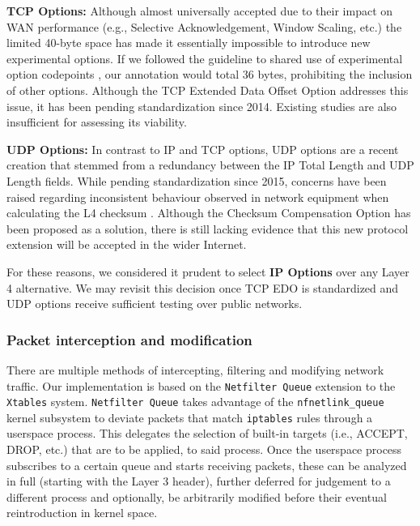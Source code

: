 \textbf{TCP Options:} Although almost universally accepted due to their impact on WAN performance (e.g., Selective Acknowledgement, Window Scaling, etc.) the limited 40-byte space \cite{john1981transmission} has made it essentially impossible to introduce new experimental options. If we followed the guideline to shared use of experimental option codepoints \cite{rfc6994}, our annotation would total 36 bytes, prohibiting the inclusion of other options. Although the TCP Extended Data Offset Option \cite{ietf-tcpm-tcp-edo-13} addresses this issue, it has been pending standardization since 2014. Existing studies \cite{trieu2015implementation} are also insufficient for assessing its viability.

\textbf{UDP Options:} In contrast to IP and TCP options, UDP options are a recent creation \cite{ietf-tsvwg-udp-options-23} that stemmed from a redundancy between the IP Total Length and UDP Length fields. While pending standardization since 2015, concerns have been raised regarding inconsistent behaviour observed in network equipment when calculating the L4 checksum \cite{zullo2020overcoming}. Although the Checksum Compensation Option \cite{fairhurst-udp-options-cco-00} has been proposed as a solution, there is still lacking evidence that this new protocol extension will be accepted in the wider Internet.

For these reasons, we considered it prudent to select \textbf{IP Options} over any Layer 4 alternative. We may revisit this decision once TCP EDO is standardized and UDP options receive sufficient testing over public networks.


\subsubsection{Packet interception and modification}

There are multiple methods of intercepting, filtering and modifying network traffic. Our implementation is based on the \texttt{Netfilter Queue} extension to the \texttt{Xtables} system. \texttt{Netfilter Queue} takes advantage of the \texttt{nfnetlink\_queue} kernel subsystem to deviate packets that match \texttt{iptables} rules through a userspace process. This delegates the selection of built-in targets (i.e., ACCEPT, DROP, etc.) that are to be applied, to said process. Once the userspace process subscribes to a certain queue and starts receiving packets, these can be analyzed in full (starting with the Layer 3 header), further deferred for judgement to a different process and optionally, be arbitrarily modified before their eventual reintroduction in kernel space.

